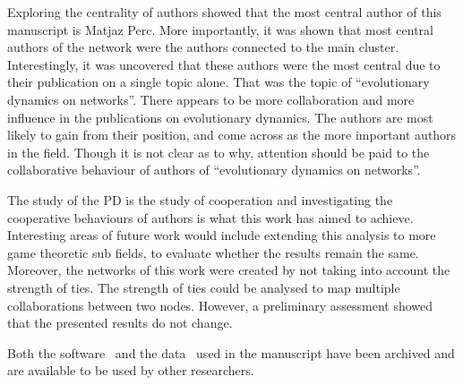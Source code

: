 \documentclass{article}
\theoremstyle{definition}
\begin{document}
Exploring the centrality of authors showed that the most central author of this
manuscript is Matjaz Perc. More importantly, it was shown that most central
authors of the network were the authors connected to the main cluster.
Interestingly, it was uncovered that these authors were the most central due to
their publication on a single topic alone. That was the topic of “evolutionary
dynamics on networks”. There appears to be more collaboration and more influence
in the publications on evolutionary dynamics. The authors are most likely to
gain from their position, and come across as the more important authors in the
field. Though it is not clear as to why, attention should be paid to the
collaborative behaviour of authors of “evolutionary dynamics on networks”.

The study of the PD is the study of cooperation and investigating the
cooperative behaviours of authors is what this work has aimed to achieve.
Interesting areas of future work would include extending this analysis to more
game theoretic sub fields, to evaluate whether the results remain the same.
Moreover, the networks of this work were created by not taking into account the
strength of ties. The strength of ties could be analysed to map multiple
collaborations between two nodes. However, a preliminary assessment showed that
the presented results do not change.

Both the software~\cite{nikoleta_2017} and the data~\cite{pd_data_2018} used in
the manuscript have been archived and are available to be used by other
researchers.
\end{document}
